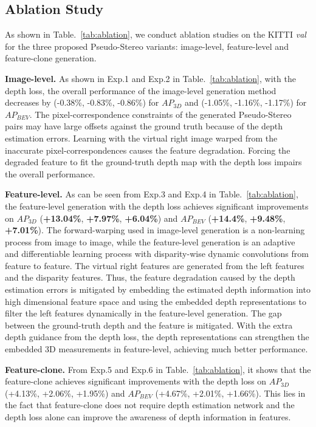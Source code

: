 \documentclass[10pt,twocolumn,letterpaper]{article}
\begin{document}
\subsection{Ablation Study}
As shown in Table.~\ref{tab:ablation}, we conduct ablation studies on the KITTI \emph{val} for the three proposed Pseudo-Stereo variants: image-level, feature-level and feature-clone generation. 


\noindent\textbf{Image-level.} As shown in Exp.1 and Exp.2 in Table.~\ref{tab:ablation}, with the depth loss, the overall performance of the image-level generation method decreases by (-0.38\%, -0.83\%, -0.86\%) for $AP_{3D}$ and (-1.05\%, -1.16\%, -1.17\%) for $AP_{BEV}$. The pixel-correspondence constraints of the generated Pseudo-Stereo pairs may have large offsets against the ground truth because of the depth estimation errors. Learning with the virtual right image warped from the inaccurate pixel-correspondences causes the feature degradation. Forcing the degraded feature to 
fit the ground-truth depth map with the depth loss impairs the overall performance. 




\noindent\textbf{Feature-level.} As can be seen from Exp.3 and Exp.4 in Table.~\ref{tab:ablation}, the feature-level generation with the depth loss achieves significant improvements on $AP_{3D}$ (\textbf{+13.04\%}, \textbf{+7.97\%}, \textbf{+6.04\%}) and $AP_{BEV}$ (\textbf{+14.4\%}, \textbf{+9.48\%}, \textbf{+7.01\%}). The forward-warping used in image-level generation is a non-learning process from image to image, while the feature-level generation is an adaptive and differentiable learning process with disparity-wise dynamic convolutions from feature to feature. The virtual right features are generated from the left features and the disparity features. Thus, the feature degradation caused by the depth estimation errors is mitigated by embedding the estimated depth information into high dimensional feature space and using the embedded depth representations to filter the left features dynamically in the feature-level generation. The gap between the ground-truth depth and the feature is mitigated. With the extra depth guidance from the depth loss, the depth representations can strengthen the embedded 3D measurements in feature-level, achieving much better performance.


\noindent\textbf{Feature-clone.} From Exp.5 and Exp.6 in Table.~\ref{tab:ablation}, it shows that the feature-clone achieves significant improvements with the depth loss on $AP_{3D}$ (+4.13\%, +2.06\%, +1.95\%) and $AP_{BEV}$ (+4.67\%, +2.01\%, +1.66\%). This lies in the fact that feature-clone does not require depth estimation network and the depth loss alone can improve the awareness of depth information in features. 
\end{document}
